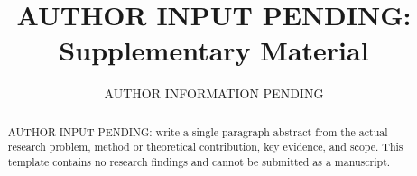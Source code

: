 \documentclass[letterpaper]{article}
\title{AUTHOR INPUT PENDING: Supplementary Material}\author{AUTHOR INFORMATION PENDING}\affiliations{AUTHOR INFORMATION PENDING}
\begin{document}
\maketitle
\begin{abstract}
AUTHOR INPUT PENDING: write a single-paragraph abstract from the actual research problem,
method or theoretical contribution, key evidence, and scope. This template contains
no research findings and cannot be submitted as a manuscript.
\end{abstract}


\clearpage
\end{document}
